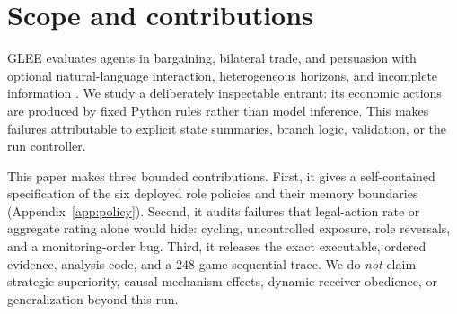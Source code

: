 \section{Scope and contributions}

GLEE evaluates agents in bargaining, bilateral trade, and persuasion with
optional natural-language interaction, heterogeneous horizons, and incomplete
information \citep{shapira2024glee}. We study a deliberately inspectable
entrant: its economic actions are produced by fixed Python rules rather than
model inference. This makes failures attributable to explicit state summaries,
branch logic, validation, or the run controller.

This paper makes three bounded contributions. First, it gives a self-contained
specification of the six deployed role policies and their memory boundaries
(Appendix~\ref{app:policy}). Second, it audits failures that legal-action rate or
aggregate rating alone would hide: cycling, uncontrolled exposure, role
reversals, and a monitoring-order bug. Third, it releases the exact executable,
ordered evidence, analysis code, and a 248-game sequential trace. We do
\emph{not} claim strategic superiority, causal mechanism effects, dynamic
receiver obedience, or generalization beyond this run.
